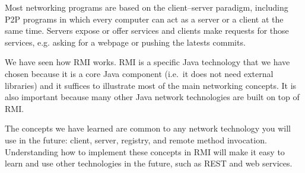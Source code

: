 Most networking programs are based on the client--server paradigm,
including P2P programs in which every computer can act as a server or
a client at the same time. Servers expose or offer services and
clients make requests for those services, e.g. asking for a webpage or
pushing the latests commits. 

We have seen how RMI works. RMI is a specific Java technology that we
have chosen because it is a core Java component (i.e.~it does not need
external libraries) and it suffices to illustrate most of the main
networking concepts. It is also important because many other Java
network technologies are built on top of RMI. 

The concepts we have learned are common to any
network technology you will use in the future: client, server,
registry, and remote method invocation. Understanding how
to implement these concepts in RMI will make it easy to learn and use
other technologies in the future, such as REST and web services.


